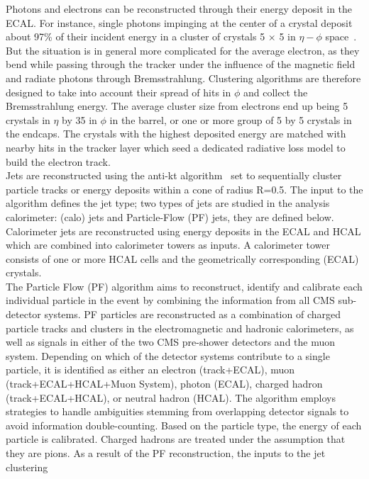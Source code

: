 \indent Photons and electrons can be reconstructed through their energy deposit in the ECAL. 
For instance, single photons impinging at the center of a crystal deposit about 97\% of their 
incident energy in a cluster of crystals 5 $\times$ 5 in $\eta-\phi$ space~\cite{Bayatian:922757}. 
But the situation is in general more complicated for the average electron, as they bend while 
passing through the tracker under the influence of the magnetic field and radiate photons through 
Bremsstrahlung. Clustering algorithms are therefore designed to take into account their spread of 
hits in $\phi$ and collect the Bremsstrahlung energy. The average cluster size from electrons end 
up being 5 crystals in $\eta$ by 35 in $\phi$ in the barrel, or one or more group of 5 by 5 
crystals in the endcaps. The crystals with the highest deposited energy are matched with nearby 
hits in the tracker layer which seed a dedicated radiative loss model to build the electron track.\\
\indent Jets are reconstructed using the anti-kt algorithm~\cite{antikt} set to sequentially cluster 
particle tracks or energy deposits within a cone of radius R=0.5. The input to the algorithm defines
the jet type; two types of jets are studied in the analysis calorimeter: (calo) jets and Particle-Flow 
(PF) jets, they are defined below.\\
\indent Calorimeter jets are reconstructed using energy deposits in the ECAL and HCAL which are 
combined into calorimeter towers as inputs. A calorimeter tower consists of one or more HCAL cells 
and the geometrically corresponding (ECAL) crystals.\\
\indent The Particle Flow (PF) algorithm aims to reconstruct, identify and calibrate each individual 
particle in the event by combining the information from all CMS sub-detector systems. PF particles are 
reconstructed as a combination of charged particle tracks and clusters in the electromagnetic 
and hadronic calorimeters, as well as signals in either of the two CMS pre-shower detectors 
and the muon system. Depending on which of the detector systems contribute to a single particle, 
it is identified as either an electron (track+ECAL), muon (track+ECAL+HCAL+Muon System), photon (ECAL), 
charged hadron (track+ECAL+HCAL), or neutral hadron (HCAL). The algorithm employs strategies to handle 
ambiguities stemming from overlapping detector signals to avoid information double-counting. Based on 
the particle type, the energy of each particle is calibrated. Charged hadrons are treated under the 
assumption that they are pions. As a result of the PF reconstruction, the inputs to the jet clustering 
